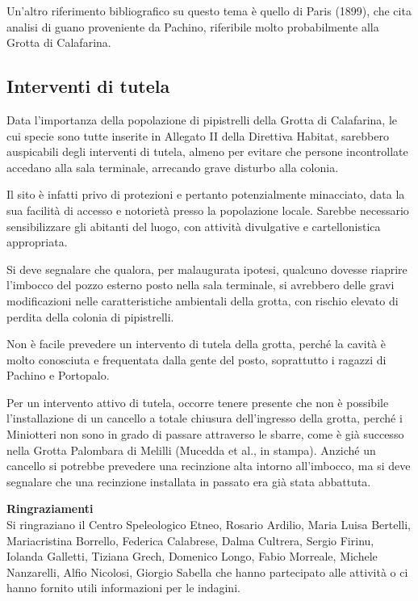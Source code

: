\begin{multicols}{2}
Un’altro riferimento bibliografico su questo tema è quello di Paris (1899), che cita analisi di guano proveniente da Pachino, riferibile molto probabilmente alla Grotta di Calafarina. 

\subsection*{Interventi di tutela}
Data l’importanza della popolazione di pipistrelli della Grotta di Calafarina, le cui specie sono tutte inserite in Allegato II della Direttiva Habitat, sarebbero auspicabili degli interventi di tutela, almeno per evitare che persone incontrollate accedano alla sala terminale, arrecando grave disturbo alla colonia. 

Il sito è infatti privo di protezioni e pertanto potenzialmente minacciato, data la sua facilità di accesso e notorietà presso la popolazione locale. Sarebbe necessario sensibilizzare gli abitanti del luogo, con attività divulgative e cartellonistica appropriata.

Si deve segnalare che qualora, per malaugurata ipotesi, qualcuno dovesse riaprire l’imbocco del pozzo esterno posto nella sala terminale, si avrebbero delle gravi modificazioni nelle caratteristiche ambientali della grotta, con rischio elevato di perdita della colonia di pipistrelli.

Non è facile prevedere un intervento di tutela della grotta, perché la cavità è molto conosciuta e frequentata dalla gente del posto, soprattutto i ragazzi di Pachino e Portopalo.

Per un intervento attivo di tutela, occorre tenere presente che non è possibile l’installazione di un cancello a totale chiusura dell’ingresso della grotta, perché i Miniotteri non sono in grado di passare attraverso le sbarre, come è già successo nella Grotta Palombara di Melilli (Mucedda et al., in stampa). Anziché un cancello si potrebbe prevedere una recinzione alta intorno all’imbocco, ma si deve segnalare che una recinzione installata in passato era già stata abbattuta.

\vskip3mm

\begin{small}
\noindent\textbf{Ringraziamenti}\\
Si ringraziano il Centro Speleologico Etneo, Rosario Ardilio, Maria Luisa Bertelli, Mariacristina Borrello, Federica Calabrese, Dalma Cultrera, Sergio Firinu, Iolanda Galletti, Tiziana Grech, Domenico Longo, Fabio Morreale, Michele Nanzarelli, Alfio Nicolosi, Giorgio Sabella che hanno partecipato alle attività o ci hanno fornito utili informazioni per le indagini.


\end{small}
\end{multicols}
